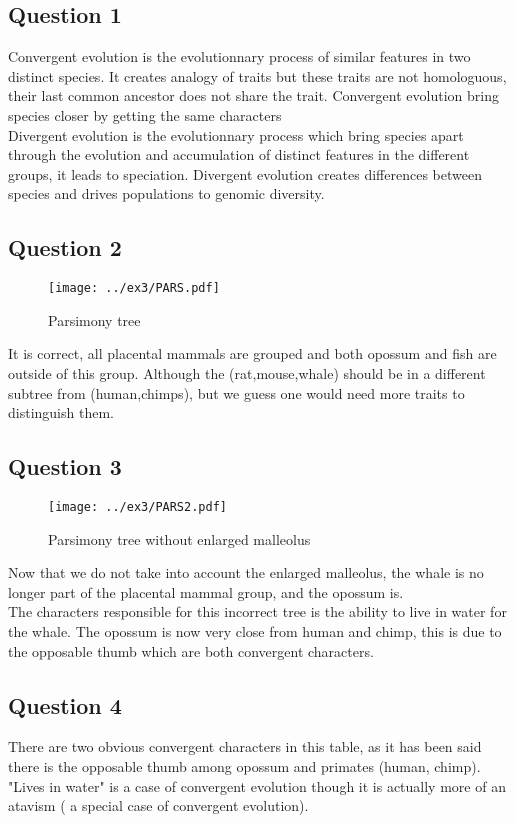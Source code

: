 \documentclass[]{article}
\theoremstyle{definition}
\begin{document}
\subsection{Question 1}

Convergent evolution is the evolutionnary process of similar features in two distinct species. It creates analogy of traits but these traits are not homologuous, their last common ancestor does not share the trait. Convergent evolution bring species closer by getting the same characters\\
Divergent evolution is the evolutionnary process which bring species apart through the evolution and accumulation of distinct features in the different groups, it leads to speciation.
Divergent evolution creates differences between species and drives populations to genomic diversity.

\subsection{Question 2}
\begin{figure}[h!]
	\texttt{[image: ../ex3/PARS.pdf]}
	\caption{\label{nj2} Parsimony tree }
\end{figure}
It is correct, all placental mammals are grouped and both opossum and fish are outside of this group. Although the (rat,mouse,whale) should be in a different subtree from (human,chimps), but we guess one would need more traits to distinguish them. 
\subsection{Question 3}
\begin{figure}[h!]
	\texttt{[image: ../ex3/PARS2.pdf]}
	\caption{\label{nj2} Parsimony tree without enlarged malleolus }
\end{figure}
Now that we do not take into account the enlarged malleolus, the whale is no longer part of the placental mammal group, and the opossum is.\\
The characters responsible for this incorrect tree is the ability to live in water for the whale. The opossum is now very close from human and chimp, this is due to the opposable thumb which are both convergent characters.\\

\subsection{Question 4}
There are two obvious convergent characters in this table, as it has been said there is the opposable thumb among opossum and primates (human, chimp).\\
"Lives in water" is a case of convergent evolution though it is actually more of an atavism ( a special case of convergent evolution).\\
\end{document}
